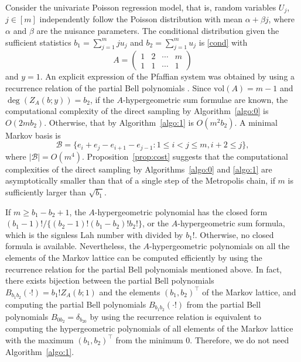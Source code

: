 \documentclass[a4paper,12pt]{article}
\theoremstyle{plain}
\theoremstyle{remark}
\begin{document}
Consider the univariate Poisson regression model, that is,
random variables $U_j$, $j\in[m]$ independently follow
the Poisson distribution with mean $\alpha+\beta j$, where
$\alpha$ and $\beta$ are the nuisance parameters.
The conditional distribution given the sufficient statistics
$b_1=\sum_{j=1}^m ju_j$ and $b_2=\sum_{j=1}^m u_j$ is
\eqref{cond} with
\begin{equation*}
A=\left(\begin{array}{cccc}
  1 & 2 & \cdots & m\\
  1 & 1 & \cdots & 1
\end{array}\right)
\label{A2row}
\end{equation*}
and $y=1$. An explicit expression of the Pfaffian system was
obtained by using a recurrence relation of the partial Bell
polynomials \cite{Man17}. Since $\text{vol}(A)=m-1$ and
$\deg(Z_A(b;y))=b_2$, if the $A$-hypergeometric sum formulae are
known, the computational complexity of the direct sampling
by Algorithm~\ref{algo:0} is $O(2mb_2)$. Otherwise, that by
Algorithm~\ref{algo:1} is $O(m^2b_2)$. A minimal Markov basis is
\[
  \mathcal{B}=\{e_i+e_j-e_{i+1}-e_{j-1}:1\le i<j\le m,i+2\le j\},
\]
where $|\mathcal{B}|=O(m^4)$. Proposition~\ref{prop:cost}
suggests that the computational complexities of the direct
sampling by Algorithms~\ref{algo:0} and \ref{algo:1} are
asymptotically smaller than that of a single step of
the Metropolis chain, if $m$ is sufficiently larger than
$\sqrt{b_1}$.

If $m\ge b_1-b_2+1$, the $A$-hypergeometric polynomial has
the closed form $(b_1-1)!/\{(b_2-1)!(b_1-b_2)!b_2!\}$, or
the $A$-hypergeometric sum formula, which is the signless Lah
number with divided by $b_1!$. Otherwise, no closed formula is
available. Nevertheless, the $A$-hypergeometric polynomials on
all the elements of the Markov lattice can be computed
efficiently by using the recurrence relation for the partial Bell
polynomials mentioned above. In fact, there exists bijection
between the partial Bell polynomials
$B_{b_1b_2}(\cdot!)=b_1!Z_A(b;1)$ and the elements
$(b_1,b_2)^\top$ of the Markov lattice, and computing the
partial Bell polynomials $B_{b_1b_2}(\cdot!)$ from the partial
Bell polynomials
$B_{0b_2}=\delta_{b_20}$ by using the recurrence relation
is equivalent to computing the hypergeometric polynomials of
all elements of the Markov lattice with the maximum
$(b_1,b_2)^\top$ from the minimum $0$. Therefore, we do not
need Algorithm~\ref{algo:1}.
\end{document}

